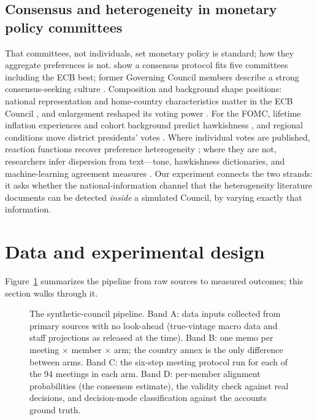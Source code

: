 \documentclass[11pt,a4paper]{article}
\begin{document}
\subsection{Consensus and heterogeneity in monetary policy committees}

That committees, not individuals, set monetary policy is standard; how they aggregate preferences is not. \textcite{riboni2010committee} show a consensus protocol fits five committees including the ECB best; former Governing Council members describe a strong consensus-seeking culture \parencite{ehrmann2023communication}. Composition and background shape positions: national representation and home-country characteristics matter in the ECB Council \parencite{badinger2013national, heinemann2021fiscal}, and enlargement reshaped its voting power \parencite{fahrholz2004emu}. For the FOMC, lifetime inflation experiences and cohort background predict hawkishness \parencite{malmendier2017hawks, bordo2018perceived}, and regional conditions move district presidents' votes \parencite{bobrov2024regional}. Where individual votes are published, reaction functions recover preference heterogeneity \parencite{jung2012voting}; where they are not, researchers infer dispersion from text---tone, hawkishness dictionaries, and machine-learning agreement measures \parencite{tobback2017between, hubert2019tone, apel2021disclose}. Our experiment connects the two strands: it asks whether the national-information channel that the heterogeneity literature documents can be detected \emph{inside} a simulated Council, by varying exactly that information.

\section{Data and experimental design}\label{sec:design}

Figure~\ref{fig:pipeline} summarizes the pipeline from raw sources to measured outcomes; this section walks through it.

\begin{figure}[t]
\centering

\caption{The synthetic-council pipeline. Band A: data inputs collected from primary sources with no look-ahead (true-vintage macro data and staff projections as released at the time). Band B: one memo per meeting $\times$ member $\times$ arm; the country annex is the only difference between arms. Band C: the six-step meeting protocol run for each of the 94 meetings in each arm. Band D: per-member alignment probabilities (the consensus estimate), the validity check against real decisions, and decision-mode classification against the accounts ground truth.}
\label{fig:pipeline}
\end{figure}
\end{document}
